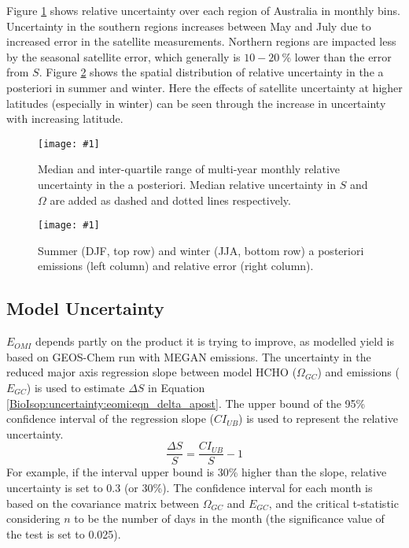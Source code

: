 \documentclass[acp, manuscript]{copernicus}
\newcommand{\Ogc}{\Omega_{GC}}  %
\newcommand{\apri}{E_{GC}} %
\newcommand{\apost}{E_{OMI}} %
\newcommand{\mypic}[3]{%
  \begin{figure}
    \texttt{[image: \#1]}
    \caption{#2}
    #3
  \end{figure}
}
\begin{document}
    
    Figure \ref{BioIsop:uncertainty:fig_ErerrSummary} shows relative uncertainty over each region of Australia in monthly bins.
    Uncertainty in the southern regions increases between May and July due to increased error in the satellite measurements.
    Northern regions are impacted less by the seasonal satellite error, which generally is $10-20~\%$ lower than the error from $S$.
    Figure \ref{BioIsop:uncertainty:fig_Ererrmap} shows the spatial distribution of relative uncertainty in the a posteriori in summer and winter.
    Here the effects of satellite uncertainty at higher latitudes (especially in winter) can be seen through the increase in uncertainty with increasing latitude.
    
    \mypic{Figures/mya_Ererr.png}{%
      Median and inter-quartile range of multi-year monthly relative uncertainty in the a posteriori.
      Median relative uncertainty in $S$ and $\Omega$ are added as dashed and dotted lines respectively.
      }{\label{BioIsop:uncertainty:fig_ErerrSummary}}
    
    \mypic{Figures/Ererr_map_summerwinter_final.png}{%
      Summer (DJF, top row) and winter (JJA, bottom row) a posteriori emissions (left column) and relative error (right column). 
    }{\label{BioIsop:uncertainty:fig_Ererrmap}}
    
    
  \subsection{Model Uncertainty}
    \label{BioIsop:uncertainty:Model}
    
    $\apost$ depends partly on the product it is trying to improve, as modelled yield is based on GEOS-Chem run with MEGAN emissions.
    The uncertainty in the reduced major axis regression slope between model HCHO ($\Ogc$) and emissions ($\apri$) is used to estimate $\Delta S$ in Equation \ref{BioIsop:uncertainty:eomi:eqn_delta_apost}.
    The upper bound of the 95\% confidence interval of the regression slope ($CI_{UB}$) is used to represent the relative uncertainty.
    \begin{equation}
      \frac{\Delta S}{S} = \frac{CI_{UB}}{S} - 1
    \end{equation}
    For example, if the interval upper bound is 30\% higher than the slope, relative uncertainty is set to 0.3 (or 30\%).
    The confidence interval for each month is based on the covariance matrix between $\Ogc$ and $\apri$, and the critical t-statistic considering $n$ to be the number of days in the month (the significance value of the test is set to 0.025).
    
\end{document}
